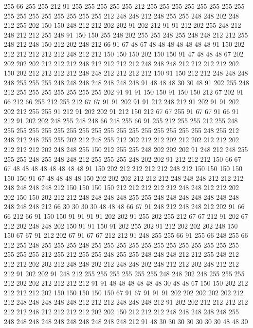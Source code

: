 255 66 255 255 212 91 255 255 255 255 255 212 255 255 255 255 255 255 255 255
255 255 255 255 255 255 255 255 212 248 248 212 248 255 255 248 248 202 248 212
255 202 150 150 248 212 212 202 202 91 202 212 91 91 212 202 255 248 212 248
212 212 255 248 91 150 150 255 248 202 255 255 248 255 248 248 212 212 255 248
212 248 150 212 202 248 212 66 91 67 48 67 48 48 48 48 48 48 48 91
150 202 212 212 212 212 212 248 212 212 150 150 150 202 150 150 91 47 48 48
48 67 202 202 202 202 212 212 212 248 212 212 212 212 248 248 248 212 212 212
212 202 150 202 212 212 212 212 248 248 212 212 212 212 150 91 150 212 212 248
248 248 248 255 255 255 248 248 248 248 248 248 248 91 48 48 48 30 30 48
91 202 255 248 212 255 255 255 255 255 255 255 202 91 91 91 150 150 91 150
150 212 67 202 91 66 212 66 255 212 255 212 67 67 91 91 202 91 91 212
248 212 91 202 91 91 202 202 212 255 255 91 212 91 202 202 91 212 150 212
67 67 255 91 67 67 91 66 91 212 91 202 202 248 255 248 248 66 248 255
66 91 255 212 255 255 212 255 248 255 255 255 255 255 255 255 255 255 255 255
255 255 255 255 255 248 255 212 248 212 248 255 255 202 212 248 255 212 202 212
212 202 212 202 212 212 202 212 212 212 202 248 248 255 150 212 255 255 248 202
202 202 91 248 212 248 255 255 255 248 255 248 248 212 255 255 255 248 202 202
91 212 212 212 150 66 67 67 48 48 48 48 48 48 48 48 91 150 202 212
212 212 212 248 212 150 150 150 150 150 150 91 67 48 48 48 48 150 202 202
202 212 212 212 248 248 248 212 212 212 248 248 248 248 212 150 150 150 150 212
212 212 212 212 248 248 212 212 202 202 150 150 202 212 212 248 248 248 248 255
255 248 248 248 248 248 248 248 248 248 248 212 66 30 30 30 30 48 48 48
66 67 91 248 212 248 248 212 202 91 66 66 212 66 91 150 150 91 91 91
91 202 202 91 255 202 255 212 67 67 212 91 202 67 212 202 248 248 202 150
91 91 150 91 202 255 202 91 212 202 202 202 248 150 150 67 67 91 212 202
67 91 67 67 212 212 91 248 255 255 66 91 255 66 248 255 66 212 255 248
255 255 255 248 255 255 255 255 255 255 255 255 255 255 255 255 255 255 255 212
255 212 255 255 248 255 255 248 248 248 212 212 255 248 212 212 212 202 202 212
248 248 202 212 248 248 202 248 212 212 202 248 212 212 212 91 202 202 91 248
212 255 255 255 255 255 255 248 248 202 248 255 255 255 212 202 202 212 212 212
212 91 91 48 48 48 48 48 48 30 48 48 67 150 150 202 212 212 212 212
202 150 150 150 150 150 67 91 67 91 91 91 202 202 202 202 202 212 212 248
248 248 248 248 212 212 212 248 248 248 212 91 202 202 212 212 212 212 212 212
248 212 212 212 212 202 202 150 212 212 212 248 248 248 248 248 255 248 248 248
248 248 248 248 248 248 248 212 91 48 30 30 30 30 30 30 30 48 48 30
